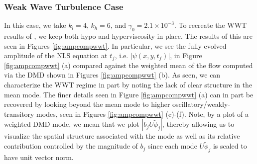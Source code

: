 \documentclass[aps,prl,preprint,groupedaddress]{revtex4-1}
\begin{document}
\subsubsection*{Weak Wave Turbulence Case}
In this case, we take $k_{l}=4$, $k_{h}=6$, and $\gamma_{0}=2.1\times 10^{-3}$.  To recreate the WWT results of \cite{nazarenko2}, we keep both hypo and hyperviscosity in place.  The results of this are seen in Figures \ref{fig:ampcompwwt}.  In particular, we see the fully evolved amplitude of the NLS equation at $t_{f}$, i.e. $|\psi(x,y,t_{f})|$, in Figure \ref{fig:ampcompwwt} (a) compared against the weighted mean of the flow computed via the DMD shown in  Figures \ref{fig:ampcompwwt} (b).  As seen, we can characterize the WWT regime in part by noting the lack of clear structure in the mean mode.  The finer details seen in Figure \ref{fig:ampcompwwt} (a) can in part be recovered by looking beyond the mean mode to higher oscillatory/weakly-transitory modes, seen in Figures \ref{fig:ampcompwwt} (c)-(f).  Note, by a plot of a weighted DMD mode, we mean that we plot $\left|b_{j}U\tilde{\phi}_{j}\right|$, thereby allowing us to visualize the spatial structure associated with the mode as well as its relative contribution controlled by the magnitude of $b_{j}$ since each mode $U\tilde{\phi}_{j}$ is scaled to have unit vector norm.  
\end{document}
